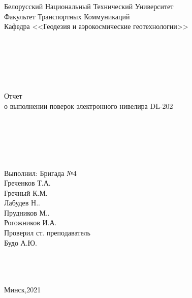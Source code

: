 \documentclass[a4paper]{article}
\begin{document}
\begin{titlepage}
\large{

\begin{center}
Белорусский Национальный Технический Университет\\
Факультет Транспортных Коммуникаций\\
Кафедра <<Геодезия и аэрокосмические геотехнологии>>\\
~\\
~\\
~\\
~\\
~\\
~\\
Отчет\\
о выполнении поверок электронного нивелира DL-202\\
~\\
~\\
~\\
~\\
~\\
\end{center}

\begin{flushright}
Выполнил: Бригада №4\\
Греченков Т.А.\\
Гречный К.М.\\
Лабудев Н..\\
Прудников М..\\
Рогожников И.А.\\
Проверил ст. преподаватель\\
Будо А.Ю.
~\\
~\\
~\\
~\\
\begin{center}
Минск,2021
\end{center}
\end{flushright}
}
\end{titlepage}
\end{document}

